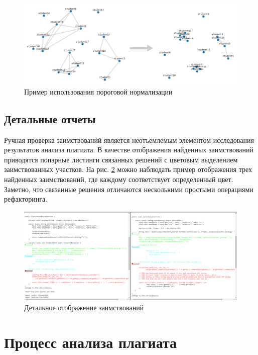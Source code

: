 \documentclass[a4paper,14pt]{extarticle}
\begin{document}
\begin{figure}[h!]
\centering
\includegraphics[width=1.0\textwidth]{graph_normalization.png}
\caption{Пример использования пороговой нормализации}
\label{fig:graph_normalization}
\end{figure}

\subsection{Детальные отчеты}

Ручная проверка заимствований является неотъемлемым элементом исследования результатов анализа плагиата. В качестве отображения найденных заимствований приводятся попарные листинги связанных решений с цветовым выделением заимствованных участков. На рис. \ref{fig:diff} можно наблюдать пример отображения трех найденных заимствований, где каждому соответствует определенный цвет. Заметно, что связанные решения отличаются несколькими простыми операциями рефакторинга.

\begin{figure}[h!]
\centering
\includegraphics[width=1.0\textwidth]{plagiarism_match.png}
\caption{Детальное отображение заимствований}
\label{fig:diff}
\end{figure}

\section{Процесс анализа плагиата}
\end{document}

